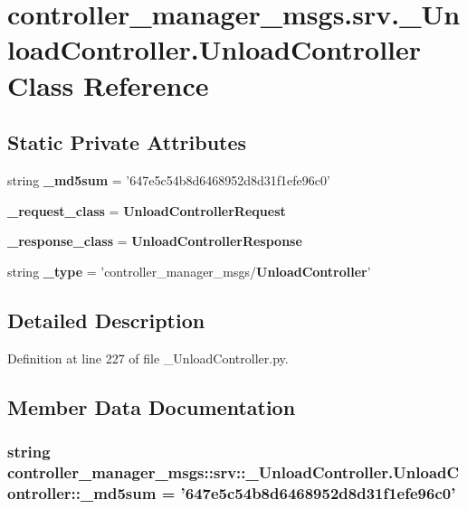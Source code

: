 \section{controller\-\_\-manager\-\_\-msgs.\-srv.\-\_\-\-Unload\-Controller.\-Unload\-Controller \-Class \-Reference}
\label{classcontroller__manager__msgs_1_1srv_1_1__UnloadController_1_1UnloadController}
\subsection*{\-Static \-Private \-Attributes}
\begin{DoxyCompactItemize}
\item 
string {\bf \-\_\-md5sum} = '647e5c54b8d6468952d8d31f1efe96c0'
\item 
{\bf \-\_\-request\-\_\-class} = {\bf \-Unload\-Controller\-Request}
\item 
{\bf \-\_\-response\-\_\-class} = {\bf \-Unload\-Controller\-Response}
\item 
string {\bf \-\_\-type} = 'controller\-\_\-manager\-\_\-msgs/{\bf \-Unload\-Controller}'
\end{DoxyCompactItemize}


\subsection{\-Detailed \-Description}


\-Definition at line 227 of file \-\_\-\-Unload\-Controller.\-py.



\subsection{\-Member \-Data \-Documentation}
\subsubsection[{\-\_\-md5sum}]{\setlength{\rightskip}{0pt plus 5cm}string {\bf controller\-\_\-manager\-\_\-msgs\-::srv\-::\-\_\-\-Unload\-Controller.\-Unload\-Controller\-::\-\_\-md5sum} = '647e5c54b8d6468952d8d31f1efe96c0'\hspace{0.3cm}{\ttfamily  [static, private]}}\label{classcontroller__manager__msgs_1_1srv_1_1__UnloadController_1_1UnloadController_a43239bb3b1dec9a9dd72e0b73adbf7d5}


